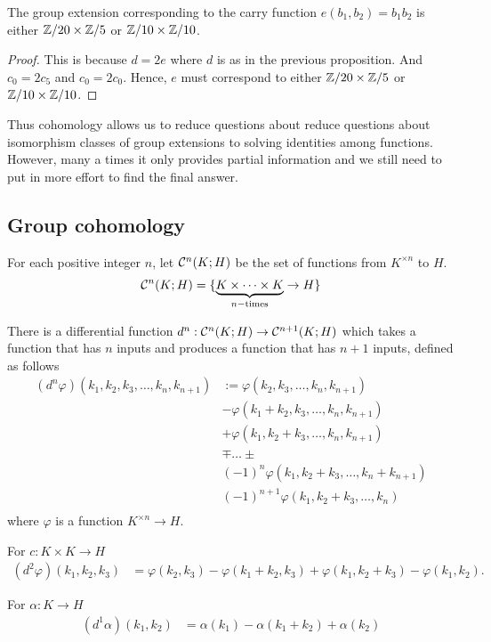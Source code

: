 \begin{proposition}
  The group extension corresponding to the carry function $e(b_1, b_2) = b_1 b_2$ is either $\mathbb{Z}/20 \times \mathbb{Z}/5$ or $\mathbb{Z}/10 \times \mathbb{Z}/10$.
\end{proposition}
\begin{proof}
  This is because $d = 2 e$ where $d$ is as in the previous proposition.
  And $c_0 = 2 c_5$ and $c_0 = 2 c_0$. Hence, $e$ must correspond to either $\mathbb{Z}/20 \times \mathbb{Z}/5$ or $\mathbb{Z}/10 \times \mathbb{Z}/10$.
\end{proof}
Thus cohomology allows us to reduce questions about reduce questions about isomorphism classes of group extensions to solving identities among functions.
However, many a times it only provides partial information and we still need to put in more effort to find the final answer.




\subsection{Group cohomology}
  For each positive integer $n$, let $\mathcal{C}^n(K;H)$ be the set of functions from $K^{\times n}$ to $H$.
  \begin{align*}
    \mathcal{C}^n(K;H) = \{ \underbrace{K \times \dots \times K}_{n-\text{times}} \rightarrow H \}
  \end{align*}

  There is a differential function $d^n: \mathcal{C}^n(K;H) \rightarrow \mathcal{C}^{n+1}(K;H)$ which takes a function that has $n$ inputs and produces a function that has $n+1$ inputs, defined as follows
  \begin{align*}
    (d^n \varphi) (k_1, k_2, k_3, \dots, k_n, k_{n+1})
    &:=
    \varphi (k_2, k_3, \dots, k_n, k_{n+1}) \\
    & -
    \varphi (k_1 + k_2, k_3, \dots, k_n, k_{n+1}) \\
    & +
    \varphi (k_1, k_2 + k_3, \dots, k_n, k_{n+1}) \\
    & \mp \dots \pm \\
    & (-1)^n \varphi (k_1, k_2 + k_3, \dots, k_n + k_{n+1}) \\
    & (-1)^{n+1} \varphi (k_1, k_2 + k_3, \dots, k_n) \\
  \end{align*}
  where $\varphi$ is a function $K^{\times n} \rightarrow H$.

  \begin{ex}
    For $c:K \times K \rightarrow H$
    \begin{align*}
      (d^2 \varphi) (k_1, k_2, k_3)
      &=
      \varphi(k_2, k_3)
      -
      \varphi(k_1 + k_2, k_3)
      +
      \varphi(k_1, k_2 + k_3)
      -
      \varphi(k_1, k_2).
    \end{align*}
  \end{ex}
  \begin{ex}
    For $\alpha: K \rightarrow H$
    \begin{align*}
      (d^1 \alpha)(k_1, k_2)
      &=
      \alpha(k_1) - \alpha(k_1 + k_2) + \alpha(k_2)
    \end{align*}
  \end{ex}

